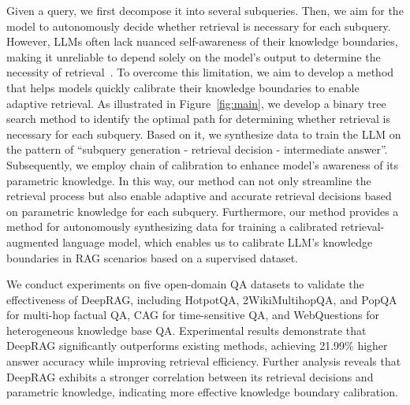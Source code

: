 Given a query, we first decompose it into several subqueries.
Then, we aim for the model to autonomously decide whether retrieval is necessary for each subquery.
% 
However, LLMs often lack nuanced self-awareness of their knowledge boundaries, making it unreliable to depend solely on the model's output to determine the necessity of retrieval~\cite{yin2023large,ren2023investigating}. 
% 
To overcome this limitation, we aim to develop a method that helps models quickly calibrate their knowledge boundaries to enable adaptive retrieval.
As illustrated in Figure~\ref{fig:main}, we develop a binary tree search method to identify the optimal path for determining whether retrieval is necessary for each subquery. 
Based on it, we synthesize data to train the LLM on the pattern of ``subquery generation - retrieval decision - intermediate answer''. 
Subsequently, we employ chain of calibration to enhance model's awareness of its parametric knowledge.
In this way, our method can not only streamline the retrieval process but also enable adaptive and accurate retrieval decisions based on parametric knowledge for each subquery.
Furthermore, our method provides a method for autonomously synthesizing data for training a calibrated retrieval-augmented language model, which enables us to calibrate LLM's knowledge boundaries in RAG scenarios based on a supervised dataset.




We conduct experiments on five open-domain QA datasets to validate the effectiveness of DeepRAG, including HotpotQA, 2WikiMultihopQA, and PopQA for multi-hop factual QA, CAG for time-sensitive QA, and WebQuestions for heterogeneous knowledge base QA.
% 
Experimental results demonstrate that DeepRAG significantly outperforms existing methods, achieving 21.99\% higher answer accuracy while improving retrieval efficiency.
Further analysis reveals that DeepRAG exhibits a stronger correlation between its retrieval decisions and parametric knowledge, indicating more effective knowledge boundary calibration.
 

